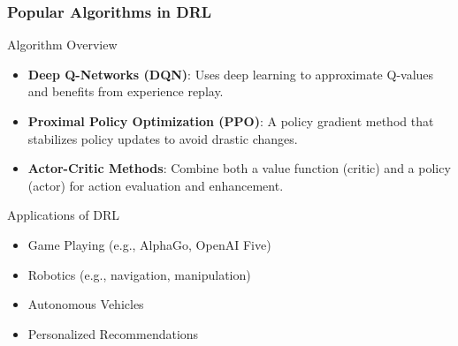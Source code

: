 \documentclass[aspectratio=169]{beamer}
\begin{document}
\begin{frame}[fragile]
    \frametitle{Popular Algorithms in DRL}
    \begin{block}{Algorithm Overview}
        \begin{itemize}
            \item \textbf{Deep Q-Networks (DQN)}: Uses deep learning to approximate Q-values and benefits from experience replay.
            \item \textbf{Proximal Policy Optimization (PPO)}: A policy gradient method that stabilizes policy updates to avoid drastic changes.
            \item \textbf{Actor-Critic Methods}: Combine both a value function (critic) and a policy (actor) for action evaluation and enhancement.
        \end{itemize}
    \end{block}
    
    \begin{block}{Applications of DRL}
        \begin{itemize}
            \item Game Playing (e.g., AlphaGo, OpenAI Five)
            \item Robotics (e.g., navigation, manipulation)
            \item Autonomous Vehicles
            \item Personalized Recommendations
        \end{itemize}
    \end{block}
\end{frame}
\end{document}
